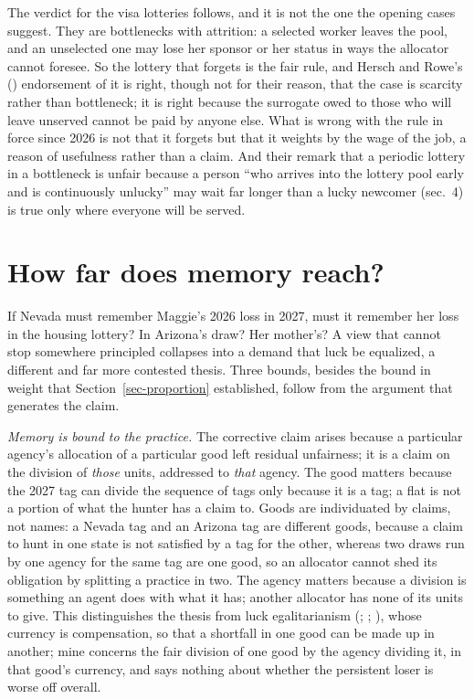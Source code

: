 \documentclass[
  11pt,
  letterpaper,
  DIV=11,
  numbers=noendperiod,
  twoside]{scrartcl}
\newcounter{none} %
\begin{document}
The verdict for the visa lotteries follows, and it is not the one the
opening cases suggest. They are bottlenecks with attrition: a selected
worker leaves the pool, and an unselected one may lose her sponsor or
her status in ways the allocator cannot foresee. So the lottery that
forgets is the fair rule, and Hersch and Rowe's
() endorsement of it is
right, though not for their reason, that the case is scarcity rather
than bottleneck; it is right because the surrogate owed to those who
will leave unserved cannot be paid by anyone else. What is wrong with
the rule in force since 2026 is not that it forgets but that it weights
by the wage of the job, a reason of usefulness rather than a claim. And
their remark that a periodic lottery in a bottleneck is unfair because a
person ``who arrives into the lottery pool early and is continuously
unlucky'' may wait far longer than a lucky newcomer (sec.~4) is true
only where everyone will be served.

\section{How far does memory reach?}\label{sec-reach}

If Nevada must remember Maggie's 2026 loss in 2027, must it remember her
loss in the housing lottery? In Arizona's draw? Her mother's? A view
that cannot stop somewhere principled collapses into a demand that luck
be equalized, a different and far more contested thesis. Three bounds,
besides the bound in weight that Section~\ref{sec-proportion}
established, follow from the argument that generates the claim.

\emph{Memory is bound to the practice.} The corrective claim arises
because a particular agency's allocation of a particular good left
residual unfairness; it is a claim on the division of \emph{those}
units, addressed to \emph{that} agency. The good matters because the
2027 tag can divide the sequence of tags only because it is a tag; a
flat is not a portion of what the hunter has a claim to. Goods are
individuated by claims, not names: a Nevada tag and an Arizona tag are
different goods, because a claim to hunt in one state is not satisfied
by a tag for the other, whereas two draws run by one agency for the same
tag are one good, so an allocator cannot shed its obligation by
splitting a practice in two. The agency matters because a division is
something an agent does with what it has; another allocator has none of
its units to give. This distinguishes the thesis from luck
egalitarianism (;
; ), whose currency is compensation, so that a shortfall in one good
can be made up in another; mine concerns the fair division of one good
by the agency dividing it, in that good's currency, and says nothing
about whether the persistent loser is worse off overall.
\end{document}
